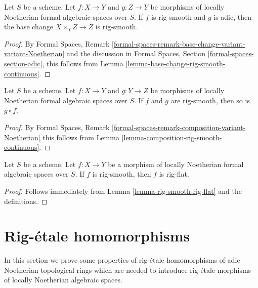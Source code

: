 \begin{lemma}
\label{lemma-base-change-rig-smooth}
Let $S$ be a scheme. Let $f : X \to Y$ and $g : Z \to Y$
be morphisms of locally Noetherian formal algebraic spaces over $S$.
If $f$ is rig-smooth and $g$ is adic, then the base change
$X \times_Y Z \to Z$ is rig-smooth.
\end{lemma}

\begin{proof}
By Formal Spaces, Remark
\ref{formal-spaces-remark-base-change-variant-variant-Noetherian}
and the discussion in Formal Spaces, Section
\ref{formal-spaces-section-adic},
this follows from Lemma \ref{lemma-base-change-rig-smooth-continuous}.
\end{proof}

\begin{lemma}
\label{lemma-composition-rig-smooth}
Let $S$ be a scheme. Let $f : X \to Y$ and $g : Y \to Z$
be morphisms of locally Noetherian formal algebraic spaces over $S$.
If $f$ and $g$ are rig-smooth, then so is $g \circ f$.
\end{lemma}

\begin{proof}
By Formal Spaces, Remark
\ref{formal-spaces-remark-composition-variant-Noetherian}
this follows from Lemma \ref{lemma-composition-rig-smooth-continuous}.
\end{proof}

\begin{lemma}
\label{lemma-rig-smooth-rig-flat-morphism}
Let $S$ be a scheme. Let $f : X \to Y$ be a morphism of
locally Noetherian formal algebraic spaces over $S$.
If $f$ is rig-smooth, then $f$ is rig-flat.
\end{lemma}

\begin{proof}
Follows immediately from Lemma \ref{lemma-rig-smooth-rig-flat}
and the definitions.
\end{proof}









\section{Rig-\'etale homomorphisms}
\label{section-rig-etale-homomorphisms}

\noindent
In this section we prove some properties of rig-\'etale homomorphisms
of adic Noetherian topological rings which are needed to introduce
rig-\'etale morphisms of locally Noetherian algebraic spaces.

